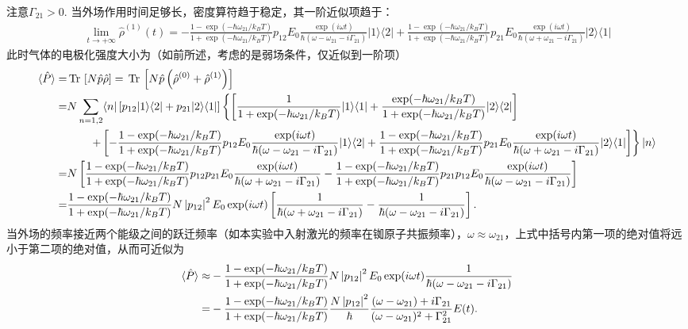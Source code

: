 \documentclass{assignment}
\begin{document}
注意$\Gamma_{21}>0$.
当外场作用时间足够长，密度算符趋于稳定，其一阶近似项趋于：
\small
\begin{align}
    \lim_{t\rightarrow+\infty}\hat{\rho}^{(1)}(t)=-\frac{1-\exp(-\hbar\omega_{21}/k_BT)}{1+\exp(-\hbar\omega_{21}/k_BT)}p_{12}E_0\frac{\exp(i\omega t)}{\hbar(\omega-\omega_{21}-i\Gamma_{21})}\lvert 1\rangle\langle 2\rvert+\frac{1-\exp(-\hbar\omega_{21}/k_BT)}{1+\exp(-\hbar\omega_{21}/k_BT)}p_{21}E_0\frac{\exp(i\omega t)}{\hbar(\omega+\omega_{21}-i\Gamma_{21})}\lvert 2\rangle\langle 1\rvert
\end{align}
\normalsize
此时气体的电极化强度大小为（如前所述，考虑的是弱场条件，仅近似到一阶项）
\small
\begin{align}
    \notag\langle\hat{P}\rangle=&\,\text{Tr}\,\left[N\hat{p}\hat{\rho}\right]=\,\text{Tr}\,\left[N\hat{p}\left(\hat{\rho}^{(0)}+\hat{\rho}^{(1)}\right)\right]\\
    \notag=&N\sum_{n=1,2}\langle n\rvert\left[p_{12}\lvert 1\rangle\langle 2\rvert+p_{21}\lvert 2\rangle\langle 1\rvert\right]\left\{\left[\frac{1}{1+\exp(-\hbar\omega_{21}/k_BT)}\lvert 1\rangle\langle 1\rvert+\frac{\exp(-\hbar\omega_{21}/k_BT)}{1+\exp(-\hbar\omega_{21}/k_BT)}\lvert 2\rangle\langle 2\rvert\right]\right.\\
    \notag&\qquad\left.+\left[-\frac{1-\exp(-\hbar\omega_{21}/k_BT)}{1+\exp(-\hbar\omega_{21}/k_BT)}p_{12}E_0\frac{\exp(i\omega t)}{\hbar(\omega-\omega_{21}-i\Gamma_{21})}\lvert 1\rangle\langle 2\rvert+\frac{1-\exp(-\hbar\omega_{21}/k_BT)}{1+\exp(-\hbar\omega_{21}/k_BT)}p_{21}E_0\frac{\exp(i\omega t)}{\hbar(\omega+\omega_{21}-i\Gamma_{21})}\lvert 2\rangle\langle 1\rvert\right]\right\}\lvert n\rangle\\
    \notag=&N\left[\frac{1-\exp(-\hbar\omega_{21}/k_BT)}{1+\exp(-\hbar\omega_{21}/k_BT)}p_{12}p_{21}E_0\frac{\exp(i\omega t)}{\hbar(\omega+\omega_{21}-i\Gamma_{21})}-\frac{1-\exp(-\hbar\omega_{21}/k_BT)}{1+\exp(-\hbar\omega_{21}/k_BT)}p_{21}p_{12}E_0\frac{\exp(i\omega t)}{\hbar(\omega-\omega_{21}-i\Gamma_{21})}\right]\\
    =&\frac{1-\exp(-\hbar\omega_{21}/k_BT)}{1+\exp(-\hbar\omega_{21}/k_BT)}N\left\lvert p_{12}\right\rvert^2E_0\exp(i\omega t)\left[\frac{1}{\hbar(\omega+\omega_{21}-i\Gamma_{21})}-\frac{1}{\hbar(\omega-\omega_{21}-i\Gamma_{21})}\right].
\end{align}
\normalsize
当外场的频率接近两个能级之间的跃迁频率（如本实验中入射激光的频率在铷原子共振频率），$\omega\approx\omega_{21}$，上式中括号内第一项的绝对值将远小于第二项的绝对值，从而可近似为
\begin{align}
    \notag\langle\hat{P}\rangle\approx&-\frac{1-\exp(-\hbar\omega_{21}/k_BT)}{1+\exp(-\hbar\omega_{21}/k_BT)}N\left\lvert p_{12}\right\rvert^2E_0\exp(i\omega t)\frac{1}{\hbar(\omega-\omega_{21}-i\Gamma_{21})}\\
    =&-\frac{1-\exp(-\hbar\omega_{21}/k_BT)}{1+\exp(-\hbar\omega_{21}/k_BT)}\frac{N\left\lvert p_{12}\right\rvert^2}{\hbar}\frac{(\omega-\omega_{21})+i\Gamma_{21}}{(\omega-\omega_{21})^2+\Gamma_{21}^2}E(t).
\end{align}
\end{document}
